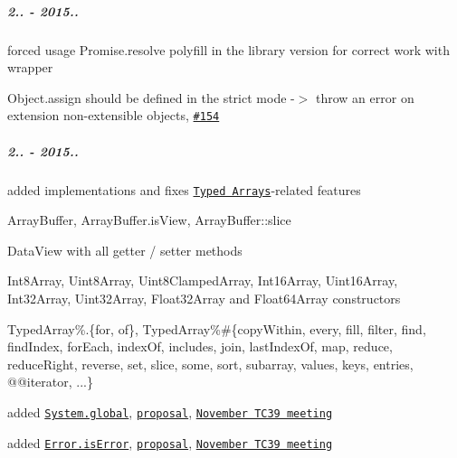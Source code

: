 \subparagraph*{2.. -\/ 2015..}


\begin{DoxyItemize}
\item forced usage {\ttfamily Promise.\+resolve} polyfill in the {\ttfamily library} version for correct work with wrapper
\item {\ttfamily Object.\+assign} should be defined in the strict mode -\/$>$ throw an error on extension non-\/extensible objects, \href{https://github.com/zloirock/core-js/issues/154}{\tt \#154}
\end{DoxyItemize}

\subparagraph*{2.. -\/ 2015..}


\begin{DoxyItemize}
\item added implementations and fixes \href{https://github.com/zloirock/core-js#ecmascript-6-typed-arrays}{\tt Typed Arrays}-\/related features
\begin{DoxyItemize}
\item {\ttfamily Array\+Buffer}, {\ttfamily Array\+Buffer.\+is\+View}, {\ttfamily Array\+Buffer\+::slice}
\item {\ttfamily Data\+View} with all getter / setter methods
\item {\ttfamily Int8\+Array}, {\ttfamily Uint8\+Array}, {\ttfamily Uint8\+Clamped\+Array}, {\ttfamily Int16\+Array}, {\ttfamily Uint16\+Array}, {\ttfamily Int32\+Array}, {\ttfamily Uint32\+Array}, {\ttfamily Float32\+Array} and {\ttfamily Float64\+Array} constructors
\item {\ttfamily Typed\+Array\%.\{for, of\}}, {\ttfamily Typed\+Array\%\#\{copy\+Within, every, fill, filter, find, find\+Index, for\+Each, index\+Of, includes, join, last\+Index\+Of, map, reduce, reduce\+Right, reverse, set, slice, some, sort, subarray, values, keys, entries, @@iterator, ...\}}
\end{DoxyItemize}
\item added \href{https://github.com/zloirock/core-js#ecmascript-7-proposals}{\tt {\ttfamily System.\+global}}, \href{https://github.com/tc39/proposal-global}{\tt proposal}, \href{https://github.com/rwaldron/tc39-notes/tree/master/es7/2015-11/nov-19.md#systemglobal-jhd}{\tt November T\+C39 meeting}
\item added \href{https://github.com/zloirock/core-js#ecmascript-7-proposals}{\tt {\ttfamily Error.\+is\+Error}}, \href{https://github.com/ljharb/proposal-is-error}{\tt proposal}, \href{https://github.com/rwaldron/tc39-notes/tree/master/es7/2015-11/nov-19.md#jhd-erroriserror}{\tt November T\+C39 meeting}

\end{DoxyItemize}
